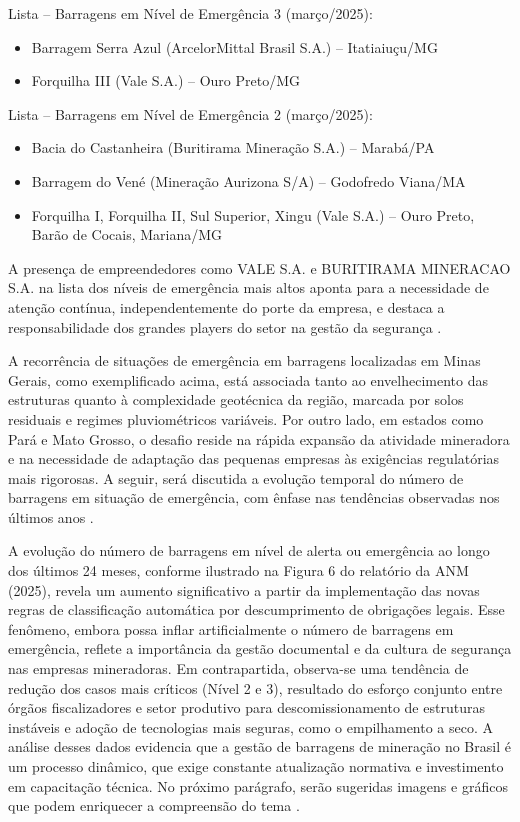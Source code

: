 Lista – Barragens em Nível de Emergência 3 (março/2025):
\begin{itemize}
    \item Barragem Serra Azul (ArcelorMittal Brasil S.A.) – Itatiaiuçu/MG
    \item Forquilha III (Vale S.A.) – Ouro Preto/MG
\end{itemize}

Lista – Barragens em Nível de Emergência 2 (março/2025):
\begin{itemize}
    \item Bacia do Castanheira (Buritirama Mineração S.A.) – Marabá/PA
    \item Barragem do Vené (Mineração Aurizona S/A) – Godofredo Viana/MA
    \item Forquilha I, Forquilha II, Sul Superior, Xingu (Vale S.A.) – Ouro Preto, Barão de Cocais, Mariana/MG
\end{itemize}

A presença de empreendedores como VALE S.A. e BURITIRAMA MINERACAO S.A. na lista dos níveis de emergência mais altos aponta para a necessidade de atenção contínua, independentemente do porte da empresa, e destaca a responsabilidade dos grandes players do setor na gestão da segurança \cite{anm2025boletim}.

A recorrência de situações de emergência em barragens localizadas em Minas Gerais, como exemplificado acima, está associada tanto ao envelhecimento das estruturas quanto à complexidade geotécnica da região, marcada por solos residuais e regimes pluviométricos variáveis. Por outro lado, em estados como Pará e Mato Grosso, o desafio reside na rápida expansão da atividade mineradora e na necessidade de adaptação das pequenas empresas às exigências regulatórias mais rigorosas. A seguir, será discutida a evolução temporal do número de barragens em situação de emergência, com ênfase nas tendências observadas nos últimos anos \cite{anm2025boletim}.

A evolução do número de barragens em nível de alerta ou emergência ao longo dos últimos 24 meses, conforme ilustrado na Figura 6 do relatório da ANM (2025), revela um aumento significativo a partir da implementação das novas regras de classificação automática por descumprimento de obrigações legais. Esse fenômeno, embora possa inflar artificialmente o número de barragens em emergência, reflete a importância da gestão documental e da cultura de segurança nas empresas mineradoras. Em contrapartida, observa-se uma tendência de redução dos casos mais críticos (Nível 2 e 3), resultado do esforço conjunto entre órgãos fiscalizadores e setor produtivo para descomissionamento de estruturas instáveis e adoção de tecnologias mais seguras, como o empilhamento a seco. A análise desses dados evidencia que a gestão de barragens de mineração no Brasil é um processo dinâmico, que exige constante atualização normativa e investimento em capacitação técnica. No próximo parágrafo, serão sugeridas imagens e gráficos que podem enriquecer a compreensão do tema \cite{anm2025boletim}.

